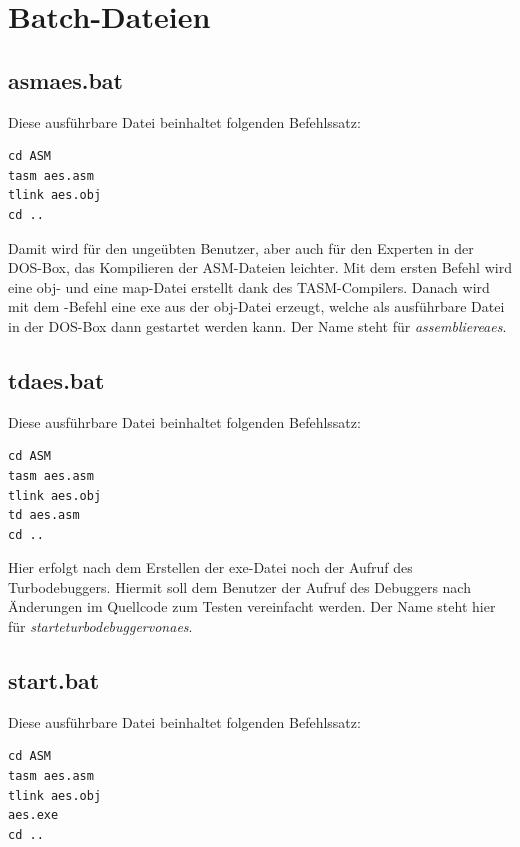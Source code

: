 \section{Batch-Dateien}\label{sec:batch}

\subsection{asmaes.bat}
Diese ausführbare Datei beinhaltet folgenden Befehlssatz:

\begin{lstlisting}[language={},caption={\texttt{asmaes.bat}},label={lst:asmaes}]
cd ASM
tasm aes.asm
tlink aes.obj
cd ..
\end{lstlisting}

Damit wird für den ungeübten Benutzer, aber auch für den Experten in der DOS-Box, das Kompilieren der ASM-Dateien leichter. Mit dem ersten Befehl wird eine obj- und eine map-Datei erstellt dank des TASM-Compilers. Danach wird mit dem -Befehl eine exe aus der obj-Datei erzeugt, welche als ausführbare Datei in der DOS-Box dann gestartet werden kann. Der Name steht für \emph{assembliereaes}.

\subsection{tdaes.bat}
Diese ausführbare Datei beinhaltet folgenden Befehlssatz:

\begin{lstlisting}[language={},caption={\texttt{tdaes.bat}},label={lst:tdaes}]
cd ASM
tasm aes.asm
tlink aes.obj
td aes.asm
cd ..
\end{lstlisting}

Hier erfolgt nach dem Erstellen der exe-Datei noch der Aufruf des Turbodebuggers. Hiermit soll dem Benutzer der Aufruf des Debuggers nach Änderungen im Quellcode zum Testen vereinfacht werden. Der Name steht hier für \emph{starteturbodebuggervonaes}.

\subsection{start.bat}
Diese ausführbare Datei beinhaltet folgenden Befehlssatz:

\begin{lstlisting}[language={},caption={\texttt{start.bat}},label={lst:start}]
cd ASM
tasm aes.asm
tlink aes.obj
aes.exe
cd ..
\end{lstlisting}

